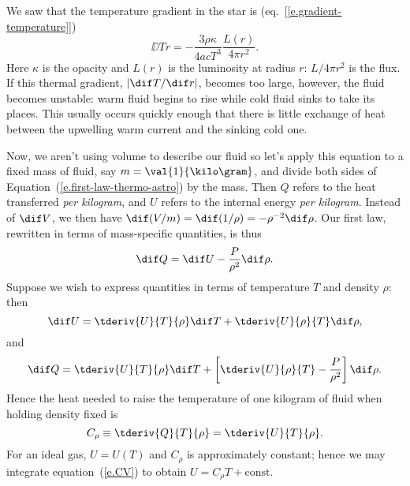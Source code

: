 We saw that the temperature gradient in the star is (eq.~[\ref{e.gradient-temperature}])
\[
    \DD{T}{r} = -\frac{3\rho\kappa}{4acT^3}\frac{L(r)}{4\pi r^2}.
\]
Here $\kappa$ is the opacity and $L(r)$ is the luminosity at radius $r$: $L/4\pi r^2$ is the flux. If this thermal gradient, $|\dif T/\dif r|$, becomes too large, however, the fluid becomes unstable: warm fluid begins to rise while cold fluid sinks to take its places.  This usually occurs quickly enough that there is little exchange of heat between the upwelling warm current and the sinking cold one.

Now, we aren't using volume to describe our fluid so let's apply this equation to a fixed mass of fluid, say $m = \val{1}{\kilo\gram}$, and divide both sides of Equation~(\ref{e.first-law-thermo-astro}) by the mass. Then $Q$ refers to the heat transferred \emph{per kilogram}, and $U$ refers to the internal energy \emph{per kilogram}.  Instead of $\dif V$, we then have $\dif(V/m) = \dif(1/\rho) = -\rho^{-2}\dif\rho$.  Our first law, rewritten in terms of mass-specific quantities, is thus
\begin{equation}\label{e.first-law-thermo-astro}
	\dif Q = \dif U -\frac{P}{\rho^{2}}\dif \rho.
\end{equation}
Suppose we wish to express quantities in terms of temperature $T$ and density $\rho$: then
\[ \dif U = \tderiv{U}{T}{\rho}\dif T + \tderiv{U}{\rho}{T}\dif \rho, \]
and
\[ \dif Q = \tderiv{U}{T}{\rho}\dif T + \left[\tderiv{U}{\rho}{T} - \frac{P}{\rho^{2}}\right]\dif \rho. \]
Hence the heat needed to raise the temperature of one kilogram of fluid when holding density fixed is
\begin{equation}\label{e.CV}
C_{\rho} \equiv \tderiv{Q}{T}{\rho} = \tderiv{U}{T}{\rho}.
\end{equation}
For an ideal gas, $U = U(T)$ and $C_{\rho}$ is approximately constant; hence we may integrate equation~(\ref{e.CV}) to obtain $U = C_{\rho}T + \textrm{const}$.

